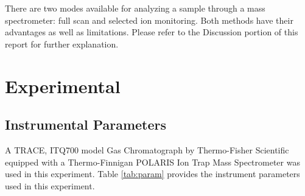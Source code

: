 \documentclass{article}
\newenvironment{nscenter}
    {\parskip=0pt\par\nopagebreak\centering}
    {\par\noindent\ignorespacesafterend}
\begin{document}
\begin{multicols}{2}
{There are two modes available for analyzing a sample through a mass
spectrometer: full scan and selected ion monitoring. Both methods have
their advantages as well as limitations. Please refer to the Discussion
portion of this report for further explanation.


\section*{Experimental}
\subsection*{Instrumental Parameters}
    A TRACE, ITQ700 model Gas Chromatograph by Thermo-Fisher
    Scientific equipped with a Thermo-Finnigan POLARIS Ion Trap Mass
    Spectrometer was used in this experiment. 
    Table \ref{tab:param} provides the instrument parameters used in this
    experiment.

    \begin{nscenter}
    \label{tab:param}
    \end{nscenter}

}
\end{multicols}
\end{document}
